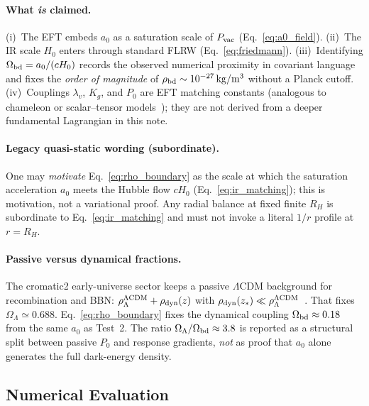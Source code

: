\documentclass[prd,
               reprint,
               aps,
               preprintnumbers,
               nofootinbib,
               longbibliography,
               floatfix]{revtex4-2}
\begin{document}
\paragraph{What \emph{is} claimed.}
(i)~The EFT embeds $a_0$ as a saturation scale of 
$P_{\rm vac}$ (Eq.~\eqref{eq:a0_field}).
(ii)~The IR scale $H_0$ enters through standard FLRW
(Eq.~\eqref{eq:friedmann}).
(iii)~Identifying $\Omega_{\rm bd}=a_0/(cH_0)$ records the 
observed numerical proximity in covariant language and 
fixes the \emph{order of magnitude} of 
$\rho_{\rm bd}\sim10^{-27}\,\mathrm{kg/m^3}$ without a
Planck cutoff.
(iv)~Couplings $\lambda_v$, $K_g$, and $P_0$ are EFT 
matching constants (analogous to chameleon or 
scalar--tensor models~\cite{Khoury2004,Hinterbichler2011,Damour1992});
they are not derived from a deeper fundamental 
Lagrangian in this note.

\paragraph{Legacy quasi-static wording (subordinate).}
One may \emph{motivate} Eq.~\eqref{eq:rho_boundary} as 
the scale at which the saturation acceleration $a_0$ 
meets the Hubble flow $cH_0$ (Eq.~\eqref{eq:ir_matching}); 
this is motivation, not a variational proof.
Any radial balance at fixed finite $R_H$ is subordinate 
to Eq.~\eqref{eq:ir_matching} and must not invoke a 
literal $1/r$ profile at $r=R_H$.

\paragraph{Passive versus dynamical fractions.}
The cromatic2 early-universe sector keeps a passive
$\Lambda$CDM background for recombination and BBN:
$\rho_\Lambda^{\Lambda{\rm CDM}}+\rho_{\rm dyn}(z)$ with
$\rho_{\rm dyn}(z_\ast)\ll\rho_\Lambda^{\Lambda{\rm CDM}}$~\cite{cromatic2zenodo}.
That fixes $\Omega_\Lambda\simeq 0.688$.
Eq.~\eqref{eq:rho_boundary} fixes the dynamical coupling
$\Omega_{\rm bd}\approx 0.18$ from the same $a_0$ as 
Test~2.
The ratio $\Omega_\Lambda/\Omega_{\rm bd}\approx 3.8$ 
is reported as a structural split between passive $P_0$ 
and response gradients, \emph{not} as proof that $a_0$ 
alone generates the full dark-energy density.


\subsection{Numerical Evaluation}
\label{sec:numerical}
\end{document}
